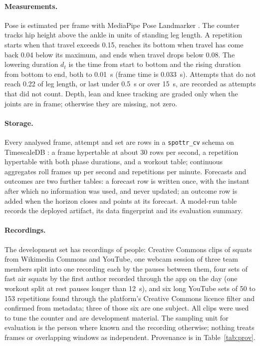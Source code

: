 \documentclass[11pt,a4paper]{article}
\begin{document}
\paragraph{Measurements.} Pose is estimated per frame with MediaPipe Pose Landmarker \cite{bazarevsky2020,mediapipedocs}. The counter tracks hip height above the ankle in units of standing leg length. A repetition starts when that travel exceeds 0.15, reaches its bottom when travel has come back 0.04 below its maximum, and ends when travel drops below 0.08. The lowering duration $d_t$ is the time from start to bottom and the rising duration from bottom to end, both to 0.01~s (frame time is 0.033~s). Attempts that do not reach 0.22 of leg length, or last under 0.5~s or over 15~s, are recorded as attempts that did not count. Depth, lean and knee tracking are graded only when the joints are in frame; otherwise they are missing, not zero.

\paragraph{Storage.} Every analysed frame, attempt and set are rows in a \texttt{spottr\_cv} schema on TimescaleDB \cite{timescaledocs}: a frame hypertable at about 30 rows per second, a repetition hypertable with both phase durations, and a workout table; continuous aggregates roll frames up per second and repetitions per minute. Forecasts and outcomes are two further tables: a forecast row is written once, with the instant after which no information was used, and never updated; an outcome row is added when the horizon closes and points at its forecast. A model-run table records the deployed artifact, its data fingerprint and its evaluation summary.

\paragraph{Recordings.} The development set has \NRecordings{} recordings of \NPeople{} people: Creative Commons clips of squats from Wikimedia Commons and YouTube, one webcam session of three team members split into one recording each by the pauses between them, four sets of fast air squats by the first author recorded through the app on the day (one workout split at rest pauses longer than 12~s), and six long YouTube sets of 50 to 153 repetitions found through the platform's Creative Commons licence filter and confirmed from metadata; three of those six are one subject. All clips were used to tune the counter and are development material. The sampling unit for evaluation is the person where known and the recording otherwise; nothing treats frames or overlapping windows as independent. Provenance is in Table~\ref{tab:prov}.
\end{document}
